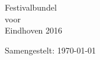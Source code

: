\documentclass[10pt,a4paper,twoside]{article}
\begin{document}
\noindent

\begin{center}
\Huge{Festivalbundel\\voor\\Eindhoven 2016}
\end{center}
\vspace*{\fill}
\tableofcontents
\vspace{1em}
\hfill\small{Samengestelt: \today}
\clearpage

\null\newpage
\newpage
{}\newpage
{}\newpage
\null\newpage
\newpage
\newpage
\end{document}
